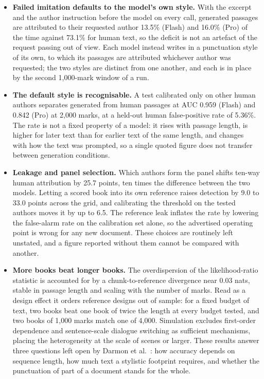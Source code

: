 \documentclass[11pt]{article}
\begin{document}
\begin{itemize}
  \item \textbf{Failed imitation defaults to the model's own
  style.}  With the excerpt and the author instruction before the model
  on every call, generated passages are attributed to their requested
  author 13.5\% (Flash) and 16.0\% (Pro) of the time against 73.1\% for
  human text, so the deficit is not an artefact of the request passing
  out of view.  Each model instead writes in a punctuation style of its
  own, to which its passages are attributed whichever author was
  requested; the two styles are distinct from one another, and each is
  in place by the second 1,000-mark window of a run.

  \item \textbf{The default style is recognisable.}  A test calibrated only on other human authors
  separates generated from human passages at AUC 0.959 (Flash) and
  0.842 (Pro) at 2,000 marks, at a held-out human false-positive rate
  of 5.36\%.  The rate is not a fixed property of a model: it rises
  with passage length, is higher for later text than for earlier text
  of the same length, and changes with how the text was prompted, so a
  single quoted figure does not transfer between generation conditions.

  \item \textbf{Leakage and panel selection.}  Which authors form the panel shifts ten-way
  human attribution by 25.7 points, ten times the difference between
  the two models.  Letting a scored book into its own reference raises
  detection by 9.0 to 33.0 points across the grid, and calibrating the
  threshold on the tested authors moves it by up to 6.5.  The reference
  leak inflates the rate by lowering the false-alarm rate on the
  calibration set alone, so the advertised operating point is wrong for
  any new document.  These choices are routinely left unstated, and a
  figure reported without them cannot be compared with another.

  \item \textbf{More books beat longer books.}  The overdispersion of the likelihood-ratio
  statistic is accounted for by a chunk-to-reference divergence near
  0.03 nats, stable in passage length and scaling with the number of
  marks.  Read as a design effect it orders reference designs out of
  sample: for a fixed budget of text, two books beat one book of twice
  the length at every budget tested, and two books of 1,000 marks match
  one of 4,000.  Simulation excludes first-order dependence and
  sentence-scale dialogue switching as sufficient mechanisms, placing
  the heterogeneity at the scale of scenes or larger.  These results
  answer three questions left open by Darmon et al.\ \cite{darmon2021}:
  how accuracy depends on sequence length, how much text a stylistic
  footprint requires, and whether the punctuation of part of a document
  stands for the whole.
\end{itemize}
\end{document}

